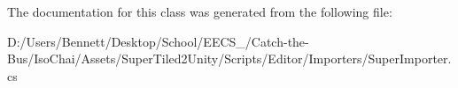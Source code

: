 The documentation for this class was generated from the following file\+:\begin{DoxyCompactItemize}
\item 
D\+:/\+Users/\+Bennett/\+Desktop/\+School/\+E\+E\+C\+S\+\_/\+Catch-\/the-\/\+Bus/\+Iso\+Chai/\+Assets/\+Super\+Tiled2\+Unity/\+Scripts/\+Editor/\+Importers/Super\+Importer.\+cs\end{DoxyCompactItemize}
